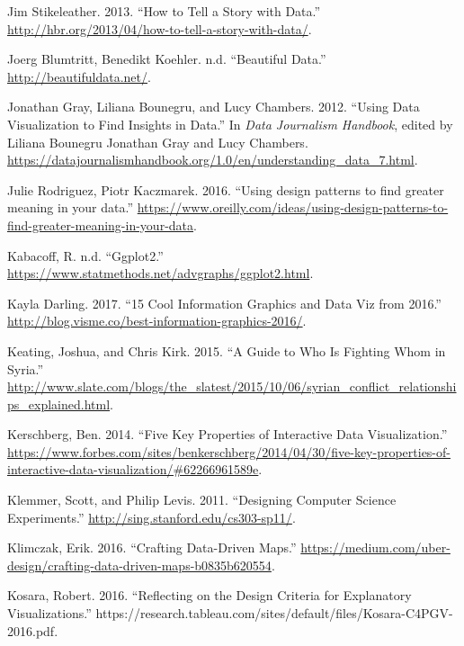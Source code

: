 \documentclass[]{book}
\begin{document}
\leavevmode\hypertarget{ref-storytelling_with_data}{}%
Jim Stikeleather. 2013. ``How to Tell a Story with Data.'' \url{http://hbr.org/2013/04/how-to-tell-a-story-with-data/}.

\leavevmode\hypertarget{ref-Beautiful_data}{}%
Joerg Blumtritt, Benedikt Koehler. n.d. ``Beautiful Data.'' \url{http://beautifuldata.net/}.

\leavevmode\hypertarget{ref-The-Data-Journalism-Handbook}{}%
Jonathan Gray, Liliana Bounegru, and Lucy Chambers. 2012. ``Using Data Visualization to Find Insights in Data.'' In \emph{Data Journalism Handbook}, edited by Liliana Bounegru Jonathan Gray and Lucy Chambers. \url{https://datajournalismhandbook.org/1.0/en/understanding_data_7.html}.

\leavevmode\hypertarget{ref-greater}{}%
Julie Rodriguez, Piotr Kaczmarek. 2016. ``Using design patterns to find greater meaning in your data.'' \url{https://www.oreilly.com/ideas/using-design-patterns-to-find-greater-meaning-in-your-data}.

\leavevmode\hypertarget{ref-viz_Rggplot}{}%
Kabacoff, R. n.d. ``Ggplot2.'' \url{https://www.statmethods.net/advgraphs/ggplot2.html}.

\leavevmode\hypertarget{ref-cool_data}{}%
Kayla Darling. 2017. ``15 Cool Information Graphics and Data Viz from 2016.'' \url{http://blog.visme.co/best-information-graphics-2016/}.

\leavevmode\hypertarget{ref-syria_chart}{}%
Keating, Joshua, and Chris Kirk. 2015. ``A Guide to Who Is Fighting Whom in Syria.'' \url{http://www.slate.com/blogs/the_slatest/2015/10/06/syrian_conflict_relationships_explained.html}.

\leavevmode\hypertarget{ref-benefits_interactive_viz}{}%
Kerschberg, Ben. 2014. ``Five Key Properties of Interactive Data Visualization.'' \url{https://www.forbes.com/sites/benkerschberg/2014/04/30/five-key-properties-of-interactive-data-visualization/\#62266961589e}.

\leavevmode\hypertarget{ref-stanford_course}{}%
Klemmer, Scott, and Philip Levis. 2011. ``Designing Computer Science Experiments.'' \url{http://sing.stanford.edu/cs303-sp11/}.

\leavevmode\hypertarget{ref-uber_maps}{}%
Klimczak, Erik. 2016. ``Crafting Data-Driven Maps.'' \url{https://medium.com/uber-design/crafting-data-driven-maps-b0835b620554}.

\leavevmode\hypertarget{ref-chart_purpose}{}%
Kosara, Robert. 2016. ``Reflecting on the Design Criteria for Explanatory Visualizations.'' https://research.tableau.com/sites/default/files/Kosara-C4PGV-2016.pdf.
\end{document}
